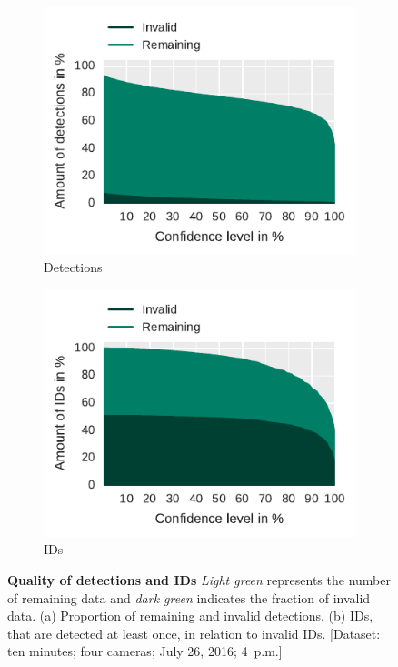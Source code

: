 \begin{figure}
    \centering
    \begin{subfigure}[b]{0.5\textwidth}
        \includegraphics[width=\textwidth]{Figures/detectionsWrongConf}
        \caption[Detections]{Detections}
        \label{fig:detections}
    \end{subfigure}%
    \begin{subfigure}[b]{0.5\textwidth}
        \includegraphics[width=\textwidth]{Figures/idsWrongConf}
        \caption[IDs]{IDs}
        \label{fig:ids}
    \end{subfigure}
 	\caption[Quality of detections and IDs]{\textbf{Quality of detections and IDs} \emph{Light green} represents the number of remaining data and \emph{dark green} indicates the fraction of invalid data. (a) Proportion of remaining and invalid detections. (b) IDs, that are detected at least once, in relation to invalid IDs.
 	[Dataset: ten minutes; four cameras; July 26, 2016; 4~p.m.]}
 	\label{fig:remainingVSquality}
\end{figure}

